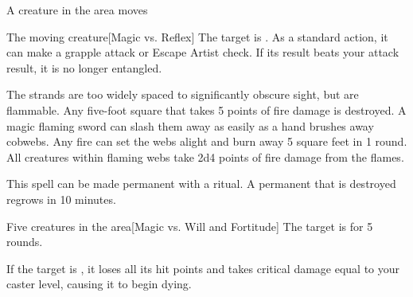 \begin{spellheader}
    \spelldur{\durshort \dismissable}
\end{spellheader}
\begin{spelleffects}
    \begin{spelltrigger}{A creature in the area moves}
        \begin{spelltarget}{The moving creature}[Magic vs. Reflex]
            \spellsuccess The target is \entangled. As a standard action, it can make a grapple attack or Escape Artist check. If its result beats your attack result, it is no longer entangled.
        \end{spelltarget}
    \end{spelltrigger}
\end{spelleffects}
\begin{spellfooter}
    \spellnotes The strands are too widely spaced to significantly obscure sight, but are flammable. Any five-foot square that takes 5 points of fire damage is destroyed. A magic flaming sword can slash them away as easily as a hand brushes away cobwebs. Any fire can set the webs alight and burn away 5 square feet in 1 round. All creatures within flaming webs take 2d4 points of fire damage from the flames.

    This spell can be made permanent with a  ritual. A permanent  that is destroyed regrows in 10 minutes.
\end{spellfooter}

\begin{spellheader}
\end{spellheader}
\begin{spelleffects}
    \begin{spelltarget}{Five creatures in the area}[Magic vs. Will and Fortitude]
        \spellsuccess[Will] The target is \shaken for 5 rounds.

         If the target is \bloodied, it loses all its hit points and takes critical damage equal to your caster level, causing it to begin dying.
    \end{spelltarget}
\end{spelleffects}
\begin{spellfooter}
    
\end{spellfooter}

